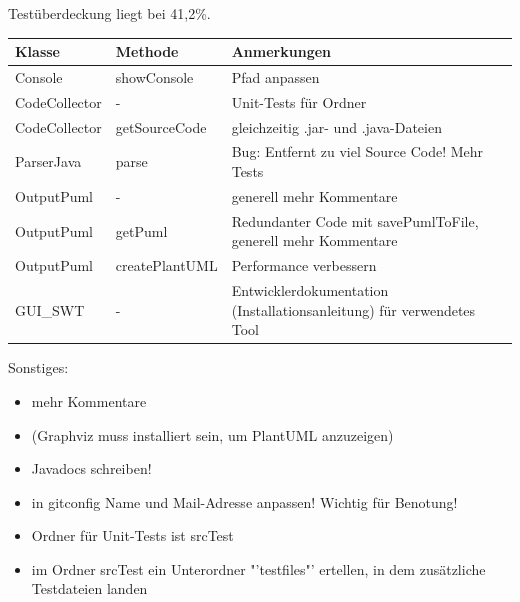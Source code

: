 Testüberdeckung liegt bei 41,2\%.
\nsecend

\begin{table}[H]

\begin{tabularx}{\textwidth}{ |l|l|X| }
\hline
\textbf{Klasse} & \textbf{Methode} & \textbf{Anmerkungen}\\
 \hline
Console & showConsole & Pfad anpassen \\
CodeCollector & - & Unit-Tests für Ordner \\
CodeCollector & getSourceCode & gleichzeitig .jar- und .java-Dateien \\
ParserJava & parse & Bug: Entfernt zu viel Source Code! Mehr Tests\\
OutputPuml & - & generell mehr Kommentare \\
OutputPuml & getPuml & Redundanter Code mit savePumlToFile, generell mehr Kommentare\\
OutputPuml & createPlantUML & Performance verbessern \\
GUI\_SWT & - & Entwicklerdokumentation (Installationsanleitung) für verwendetes Tool\\
\hline
\end{tabularx}
\end{table}

Sonstiges:
\begin{itemize}
\item mehr Kommentare
\item (Graphviz muss installiert sein, um PlantUML anzuzeigen)
\item Javadocs schreiben!
\item in gitconfig Name und Mail-Adresse anpassen! Wichtig für Benotung!
\item Ordner für Unit-Tests ist srcTest
\item im Ordner srcTest ein Unterordner "'testfiles"' ertellen, in dem zusätzliche Testdateien landen
\end{itemize}
\nsecend

